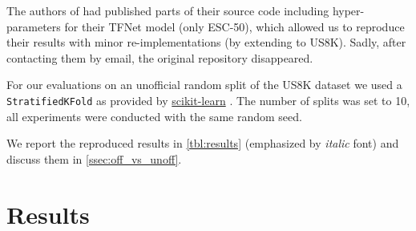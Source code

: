 \documentclass[a4paper,conference]{IEEEtran}
\begin{document}
The authors of \cite{wang2019tfnet} had published parts of their source code including hyper-parameters for their \mbox{TFNet} model (only ESC-50), which allowed us to reproduce their results with minor re-implementations (by extending to US8K).
Sadly, after contacting them by email, the original repository disappeared.

For our evaluations on an unofficial random split of the US8K dataset we used a \texttt{StratifiedKFold} as provided by \href{https://scikit-learn.org}{scikit-learn} \cite{pedregosa2011sklearn}.
The number of splits was set to 10, all experiments were conducted with the same random seed.

We report the reproduced results in \autoref{tbl:results} (emphasized by \emph{italic} font) and discuss them in \autoref{ssec:off_vs_unoff}.

\section{Results} \label{sec:results}
\end{document}
